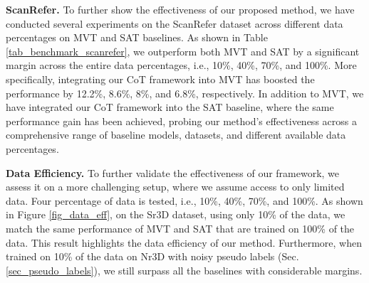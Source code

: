 \noindent \textbf{ScanRefer.} 
To further show the effectiveness of our proposed method, we have conducted several experiments on the ScanRefer dataset across different data percentages on MVT and SAT baselines.
As shown in Table \ref{tab_benchmark_scanrefer}, we outperform both MVT and SAT by a significant margin across the entire data percentages, i.e., 10\%, 40\%, 70\%, and 100\%. 
More specifically, integrating our CoT framework into MVT has boosted the performance by 12.2\%, 8.6\%, 8\%, and 6.8\%, respectively.
In addition to MVT, we have integrated our CoT framework into the SAT baseline, where the same performance gain has been achieved, probing our method's effectiveness across a comprehensive range of baseline models, datasets, and different available data percentages.

\noindent \textbf{Data Efficiency.} 
To further validate the effectiveness of our framework, we assess it on a more challenging setup, where we assume access to only limited data.
Four percentage of data is tested, i.e., 10\%, 40\%, 70\%, and 100\%.
As shown in Figure \ref{fig_data_eff}, on the Sr3D dataset, using only 10\% of the data, we match the same performance of MVT and SAT that are trained on 100\% of the data.
This result highlights the data efficiency of our method.
Furthermore, when trained on 10\% of the data on Nr3D with noisy pseudo labels (Sec. \ref{sec_pseudo_labels}), we still surpass all the baselines with considerable margins.

